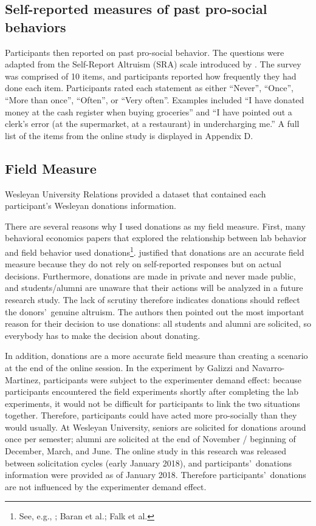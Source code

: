\documentclass[12pt]{article}
\begin{document}
\subsection{Self-reported measures of past pro-social behaviors}

Participants then reported on past pro-social behavior. The questions were adapted from the Self-Report Altruism (SRA) scale introduced by \cite{rushton_chrisjohn_fekken_1981}. The survey was comprised of 10 items, and participants reported how frequently they had done each item. Participants rated each statement as either ``Never'', ``Once'', ``More than once'', ``Often'', or ``Very often''. Examples included ``I have donated money at the cash register when buying groceries'' and ``I have pointed out a clerk\rq s error (at the supermarket, at a restaurant) in undercharging me.'' A full list of the items from the online study is displayed in Appendix D. 

\subsection{Field Measure}

Wesleyan University Relations provided a dataset that contained each participant\rq s Wesleyan donations information.

There are several reasons why I used donations as my field measure. First, many behavioral economics papers that explored the relationship between lab behavior and field behavior used donations\footnote{See, e.g., \cite{benz_meier_2006}; Baran et al.; Falk et al.}. \cite{falk_2013} justified that donations are an accurate field measure because they do not rely on self-reported responses but on actual decisions. Furthermore, donations are made in private and never made public, and students/alumni are unaware that their actions will be analyzed in a future research study. The lack of scrutiny therefore indicates donations should reflect the donors\rq \ genuine altruism. The authors then pointed out the most important reason for their decision to use donations: all students and alumni are solicited, so everybody has to make the decision about donating.

In addition, donations are a more accurate field measure than creating a scenario at the end of the online session. In the experiment by Galizzi and Navarro-Martinez, participants were subject to the experimenter demand effect: because participants encountered the field experiments shortly after completing the lab experiments, it would not be difficult for participants to link the two situations together. Therefore, participants could have acted more pro-socially than they would usually. At Wesleyan University, seniors are solicited for donations around once per semester; alumni are solicited at the end of November / beginning of December, March, and June. The online study in this research was released between solicitation cycles (early January 2018), and participants\rq \ donations information were provided as of January 2018. Therefore participants\rq \ donations are not influenced by the experimenter demand effect.
\end{document}
